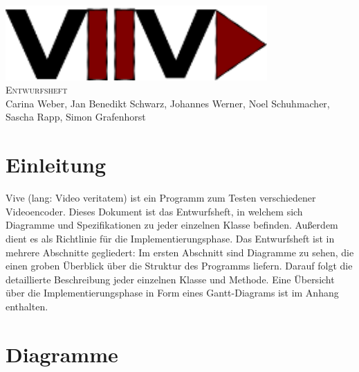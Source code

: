 \documentclass[twoside]{book}
\newcommand{\+}{\discretionary{\mbox{\scriptsize$\hookleftarrow$}}{}{}}
\newcommand{\clearemptydoublepage}{%
  \newpage{\pagestyle{empty}\cleardoublepage}%
}
\begin{document}
\hypersetup{pageanchor=false,
             bookmarks=true,
             bookmarksnumbered=true,
             pdfencoding=unicode
            }
\begin{titlepage}
\vspace*{7cm}
\begin{center}%
{\centering\includegraphics[width=10cm]{Logo.png}}\\
\vspace*{2cm}
\fontsize{40}{48} \selectfont \textsc{Entwurfsheft}\\
\vspace*{1cm}
\vspace*{0.5cm}
{\small Carina Weber, Jan Benedikt Schwarz, Johannes Werner, Noel Schuhmacher, Sascha Rapp, Simon Grafenhorst}\\
\end{center}
\end{titlepage}
\clearemptydoublepage
\tableofcontents
{}
\hypersetup{pageanchor=true}

\chapter{Einleitung}
Vive (lang: Video veritatem) ist ein Programm zum Testen verschiedener Videoencoder. Dieses Dokument ist das Entwurfsheft, in welchem sich Diagramme und Spezifikationen zu jeder einzelnen Klasse befinden. Außerdem dient es als Richtlinie für die Implementierungsphase.
Das Entwurfsheft ist in mehrere Abschnitte gegliedert: Im ersten Abschnitt sind Diagramme zu sehen, die einen groben Überblick über die Struktur des Programms liefern. Darauf folgt die detaillierte Beschreibung jeder einzelnen Klasse und Methode. Eine Übersicht über die Implementierungsphase in Form eines Gantt-Diagrams ist im Anhang enthalten.
\chapter{Diagramme}
\end{document}
